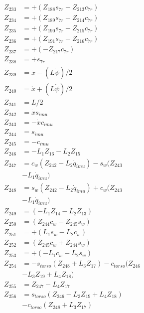 \begin{multicols}{2}
\begin{align}
Z_{233} &= + (Z_{188}s_{7r} - Z_{213}c_{7r}) \nonumber \\
Z_{234} &= + (Z_{189}s_{7r} - Z_{214}c_{7r}) \nonumber \\
Z_{235} &= + (Z_{190}s_{7r} - Z_{215}c_{7r}) \nonumber \\
Z_{236} &= + (Z_{191}s_{7r} - Z_{216}c_{7r}) \nonumber \\
Z_{237} &= + (-Z_{217}c_{7r}) \nonumber \\
Z_{238} &= + s_{7r} \nonumber \\
Z_{239} &= \dot{x} - (L\dot{\psi})/2 \nonumber \\
Z_{240} &= \dot{x} + (L\dot{\psi})/2 \nonumber \\
Z_{241} &= L/2 \nonumber \\
Z_{242} &=   \dot{x}s_{imu} \nonumber \\
Z_{243} &=  -\dot{x}c_{imu} \nonumber \\
Z_{244} &= s_{imu} \nonumber \\
Z_{245} &= -c_{imu} \nonumber \\
Z_{246} &=                                           - L_1Z_{16} - L_2Z_{15} \nonumber \\
Z_{247} &= c_{w}(Z_{242} - L_2\dot{q}_{imu}) - s_{w}(Z_{243}  \nonumber \\
&- L_1\dot{q}_{imu}) \nonumber \\
Z_{248} &= s_{w}(Z_{242} - L_2\dot{q}_{imu}) + c_{w}(Z_{243}  \nonumber \\
&- L_1\dot{q}_{imu}) \nonumber \\
Z_{249} &= (- L_1Z_{14} - L_2Z_{13}) \nonumber \\
Z_{250} &= (Z_{244}c_{w} - Z_{245}s_{w}) \nonumber \\
Z_{251} &= + (L_1s_{w} - L_2c_{w}) \nonumber \\
Z_{252} &= (Z_{245}c_{w} + Z_{244}s_{w}) \nonumber \\
Z_{253} &= + (- L_1c_{w} - L_2s_{w}) \nonumber \\
Z_{254} &= - s_{torso}(Z_{248} + L_3Z_{17}) - c_{torso}(Z_{246}  \nonumber \\
&- L_3Z_{19} + L_4Z_{18}) \nonumber \\
Z_{255} &=                                                          Z_{247} - L_4Z_{17} \nonumber \\
Z_{256} &=   s_{torso}(Z_{246} - L_3Z_{19} + L_4Z_{18})  \nonumber \\
&- c_{torso}(Z_{248} + L_3Z_{17}) \nonumber \\

\end{align}
\end{multicols}
